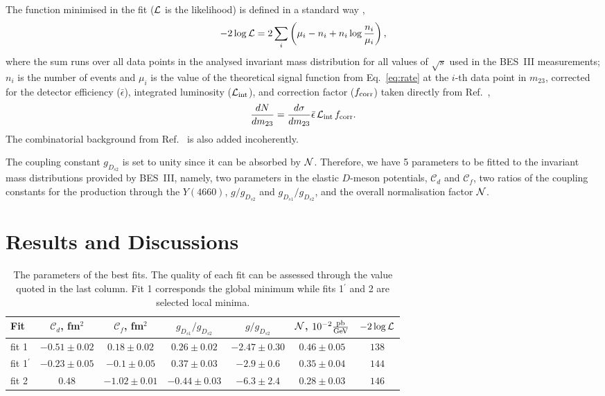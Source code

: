 \documentclass[preprint,12pt,3p]{elsarticle}
\newcommand{\be}{\begin{equation}}
\newcommand{\ee}{\end{equation}}
\begin{document}
The function minimised in the fit (${\cal L}$ is the likelihood) is defined in a standard way \cite{Zyla:2020zbs},
\be
-2\log{\cal L}=2\sum_i\left(\mu_i-n_i+n_i\log\frac{n_i}{\mu_i}\right),
\label{Lh}
\ee
where the sum runs over all data points in the analysed invariant mass distribution for all values of $\sqrt{s}$ used in the BES~III measurements; 
$n_i$ is the number of events and $ \mu_i$ is the value of the theoretical signal function from Eq.~\eqref{eq:rate} at the $i$-th data point in $m_{23}$,
corrected for the detector efficiency ($\bar{\epsilon}$), integrated luminosity (${\cal L}_{\rm int}$), and correction factor ($f_{\rm corr}$) taken directly from Ref.~\cite{BESIII:2020qkh},
\be
\frac{dN}{dm_{23}} =\frac{d \sigma}{dm_{23}} { \bar \epsilon \, {\cal L}_{\rm int} \, f_{\rm corr}}.
\ee
The combinatorial background from Ref.~\cite{BESIII:2020qkh} is also added incoherently.

The coupling constant $g_{D_{s2}}$ is set to unity since it can be absorbed by ${\cal N}$. Therefore, we have 5 parameters to be fitted to the invariant mass distributions provided by BES~III, namely, two parameters in the elastic $D$-meson potentials, $\mathcal{C}_d$ and $\mathcal{C}_f $, two ratios of the coupling constants for the production through the $Y(4660)$, $g/g_{D_{s2}}$ and $g_{D_{s1}}/g_{D_{s2}}$, and the overall normalisation factor ${\cal N}$. 

\section{Results and Discussions}

\begin{table}[t!]
\begin{center}
\begin{tabular}{|l|cccccc|}
\hline
Fit & $\mathcal{C}_{d}$, fm$^2$ & $\mathcal{C}_{f}$, fm$^2$ & $g_{D_{s1}}/g_{D_{s2}}$ & $g/g_{D_{s2}}$ & ${\cal N}$, $10^{-2} \frac{\rm pb}{\rm GeV}$
& $-2\log{\cal L}$\\
\hline
fit 1 & $-0.51\pm0.02$ & $ 0.18\pm 0.02$ & $0.26\pm0.02$ & $-2.47\pm 0.30$ & $0.46\pm 0.05$ & $138$ \\
fit 1$^\prime$ & $-0.23\pm 0.05$ & $ -0.1\pm 0.05$ & $0.37\pm 0.03$ & $-2.9\pm 0.6 $ & $0.35\pm 0.04$ & $144$ \\
fit 2 & $0.48$ & $-1.02\pm 0.01$ & $-0.44\pm 0.03$ & $ -6.3\pm 2.4$ & $0.28\pm 0.03$ & $146$\\
\hline
\end{tabular}
\end{center}
\caption{
The parameters of the best fits. The quality of each fit can be assessed through the value quoted in the last column. Fit 1 corresponds the global minimum while fits 1$^\prime$ and 2 are selected local minima.}
\label{tab:par}
\end{table}
\end{document}
